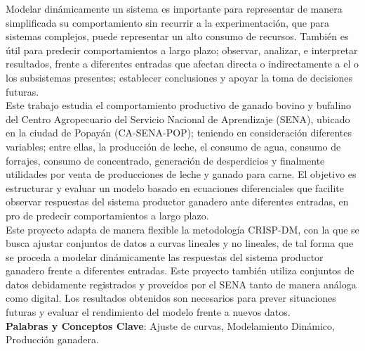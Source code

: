 Modelar dinámicamente un sistema es importante para representar de manera simplificada su comportamiento sin recurrir a la experimentación, que para sistemas complejos, puede representar un alto consumo de recursos. También es útil para predecir comportamientos a largo plazo; observar, analizar, e interpretar resultados, frente a diferentes entradas que afectan directa o indirectamente a el o los subsistemas presentes; establecer conclusiones y apoyar la toma de decisiones futuras.\\
% 

Este trabajo estudia el comportamiento productivo de ganado bovino y bufalino del Centro Agropecuario del Servicio Nacional de Aprendizaje (SENA), ubicado en la ciudad de Popayán (CA-SENA-POP); teniendo en consideración diferentes variables; entre ellas, la producción de leche, el consumo de agua, consumo de forrajes, consumo de concentrado, generación de desperdicios y finalmente utilidades por venta de producciones de leche y ganado para carne. El objetivo es estructurar y evaluar un modelo basado en ecuaciones diferenciales que facilite observar respuestas del sistema productor ganadero ante diferentes entradas, en pro de predecir comportamientos a largo plazo.\\

Este proyecto adapta de manera flexible la metodología CRISP-DM, con la que se busca ajustar conjuntos de datos a curvas lineales y no lineales, de tal forma que se proceda a modelar dinámicamente las respuestas del sistema productor ganadero frente a diferentes entradas. Este proyecto también utiliza conjuntos de datos debidamente registrados y proveídos por el SENA tanto de manera análoga como digital. Los resultados obtenidos son necesarios para prever situaciones futuras y evaluar el rendimiento del modelo frente a nuevos datos.\\

{\bf Palabras y Conceptos Clave}: Ajuste de curvas, Modelamiento Dinámico, Producción ganadera.